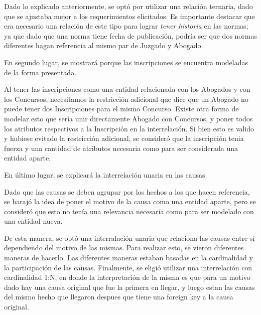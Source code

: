 Dado lo explicado anteriormente, se optó por utilizar una relación ternaria, dado que se ajustaba mejor a los requerimientos elicitados. 
Es importante destacar que era necesario una relación de este tipo para lograr \textit{tener historia} en las normas; ya que dado que una norma tiene fecha de publicación, podría ser que dos normas diferentes hagan referencia al mismo par de Juzgado y Abogado.


\bigskip

En segundo lugar, se mostrará porque las inscripciones se encuentra modeladas de la forma presentada. 

Al tener las inscripciones como una entidad relacionada con los Abogados y con los Concursos, necesitamos la restricción adicional que dice que un Abogado no puede tener dos Inscripciones para el mismo Concurso. Existe otra forma de modelar esto que sería unir directamente Abogado con Concursos, y poner todos los atributos respectivos a la Inscripción en la interrelación. Si bien esto es valido y hubiese evitado la restricción adicional, se consideró que la inscripción tenia fuerza y una cantidad de atributos necesaria como para ser considerada una entidad aparte.

\bigskip

En último lugar, se explicará la interrelación unaria en las causas. 

Dado que las causas se deben agrupar por los hechos a los que hacen referencia, se barajó la idea de poner el motivo de la causa como una entidad aparte, pero se consideró que esto no tenía una relevancia necesaria como para ser modelado con una entidad nueva. 

De esta manera, se optó una interralación unaria que relaciona las causas entre sí dependiendo del motivo de las mismas. Para realizar esto, se vieron diferentes maneras de hacerlo. Las diferentes maneras estaban basadas en la cardinalidad y la participación de las causas. Finalmente, se eligió utilizar una interrelación con cardinalidad 1:N, en donde la interpretación de la misma es que para un motivo dado hay una causa original que fue la primera en llegar, y luego estan las causas del mismo hecho que llegaron despues que tiene una foreign key a la causa original.

\newpage
